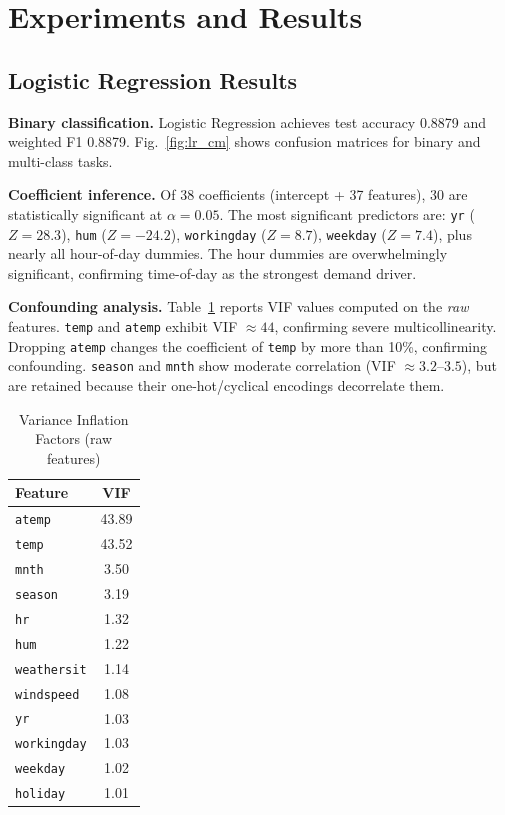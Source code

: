 \documentclass[conference]{IEEEtran}
\begin{document}
\section{Experiments and Results}

\subsection{Logistic Regression Results}
\label{sec:lr_results}

\textbf{Binary classification.}
Logistic Regression achieves test accuracy 0.8879 and weighted F1 0.8879.
Fig.~\ref{fig:lr_cm} shows confusion matrices for binary and multi-class tasks.

\textbf{Coefficient inference.}
Of 38 coefficients (intercept + 37 features), 30 are statistically significant at $\alpha = 0.05$.
The most significant predictors are:
\texttt{yr} ($Z=28.3$), \texttt{hum} ($Z=-24.2$), \texttt{workingday} ($Z=8.7$), \texttt{weekday} ($Z=7.4$), plus nearly all hour-of-day dummies.
The hour dummies are overwhelmingly significant, confirming time-of-day as the strongest demand driver.

\textbf{Confounding analysis.}
Table~\ref{tab:vif} reports VIF values computed on the \emph{raw} features.
\texttt{temp} and \texttt{atemp} exhibit VIF $\approx 44$, confirming severe multicollinearity.
Dropping \texttt{atemp} changes the coefficient of \texttt{temp} by more than 10\%, confirming confounding.
\texttt{season} and \texttt{mnth} show moderate correlation (VIF $\approx 3.2$--$3.5$), but are retained because their one-hot/cyclical encodings decorrelate them.

\begin{table}[H]
\centering
\caption{Variance Inflation Factors (raw features)}
\label{tab:vif}
\begin{tabular}{@{}lc@{}}
\toprule
\textbf{Feature} & \textbf{VIF} \\ \midrule
\texttt{atemp}      & 43.89 \\
\texttt{temp}       & 43.52 \\
\texttt{mnth}       & 3.50 \\
\texttt{season}     & 3.19 \\
\texttt{hr}         & 1.32 \\
\texttt{hum}        & 1.22 \\
\texttt{weathersit} & 1.14 \\
\texttt{windspeed}  & 1.08 \\
\texttt{yr}         & 1.03 \\
\texttt{workingday} & 1.03 \\
\texttt{weekday}    & 1.02 \\
\texttt{holiday}    & 1.01 \\
\bottomrule
\end{tabular}
\end{table}
\end{document}
